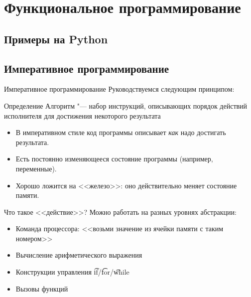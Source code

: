 \section{Функциональное программирование}
\subsection{Примеры на Python}

\begin{frame}
\end{frame}

\subsection{Императивное программирование}
\begin{frame}{Императивное программирование}
	Руководствуемся следующим принципом:
	\begin{exampleblock}{Определение}
		Алгоритм "--- набор инструкций, описывающих порядок действий исполнителя для достижения некоторого результата
	\end{exampleblock}
	\begin{itemize}
		\item В императивном стиле код программы описывает \textit{как} надо достигать результата.
		\item Есть постоянно изменяющееся состояние программы (например, переменные).
		\item Хорошо ложится на <<железо>>: оно действительно меняет состояние памяти.
	\end{itemize}
\end{frame}

\begin{frame}{Что такое <<действие>>?}
    Можно работать на разных уровнях абстракции:
	\begin{itemize}
		\item Команда процессора: <<возьми значение из ячейки памяти с таким номером>>
		\item Вычисление арифметического выражения
		\item Конструкции управления \t{if}/\t{for}/\t{while}
		\item Вызовы функций
	\end{itemize}
\end{frame}

